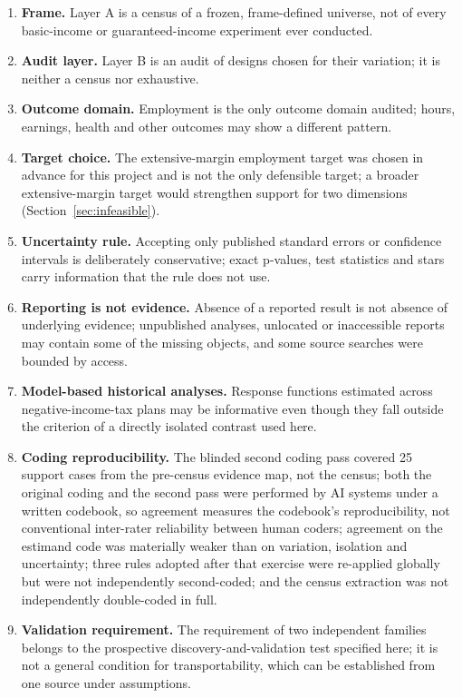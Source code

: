 \documentclass[11pt]{article}
\begin{document}
\begin{enumerate}
\item \textbf{Frame.} Layer A is a census of a frozen, frame-defined universe, not of every basic-income or guaranteed-income experiment ever conducted.
\item \textbf{Audit layer.} Layer B is an audit of designs chosen for their variation; it is neither a census nor exhaustive.
\item \textbf{Outcome domain.} Employment is the only outcome domain audited; hours, earnings, health and other outcomes may show a different pattern.
\item \textbf{Target choice.} The extensive-margin employment target was chosen in advance for this project and is not the only defensible target; a broader extensive-margin target would strengthen support for two dimensions (Section~\ref{sec:infeasible}).
\item \textbf{Uncertainty rule.} Accepting only published standard errors or confidence intervals is deliberately conservative; exact p-values, test statistics and stars carry information that the rule does not use.
\item \textbf{Reporting is not evidence.} Absence of a reported result is not absence of underlying evidence; unpublished analyses, unlocated or inaccessible reports may contain some of the missing objects, and some source searches were bounded by access.
\item \textbf{Model-based historical analyses.} Response functions estimated across negative-income-tax plans may be informative even though they fall outside the criterion of a directly isolated contrast used here.
\item \textbf{Coding reproducibility.} The blinded second coding pass covered 25 support cases from the pre-census evidence map, not the census; %
both the original coding and the second pass were performed by AI systems under a written codebook, so agreement measures the codebook's reproducibility, not conventional inter-rater reliability between human coders; agreement on the estimand code was materially weaker than on variation, isolation and uncertainty; three rules adopted after that exercise were re-applied globally but were not independently second-coded; and the census extraction was not independently double-coded in full.
\item \textbf{Validation requirement.} The requirement of two independent families belongs to the prospective discovery-and-validation test specified here; it is not a general condition for transportability, which can be established from one source under assumptions.

\end{enumerate}
\end{document}

